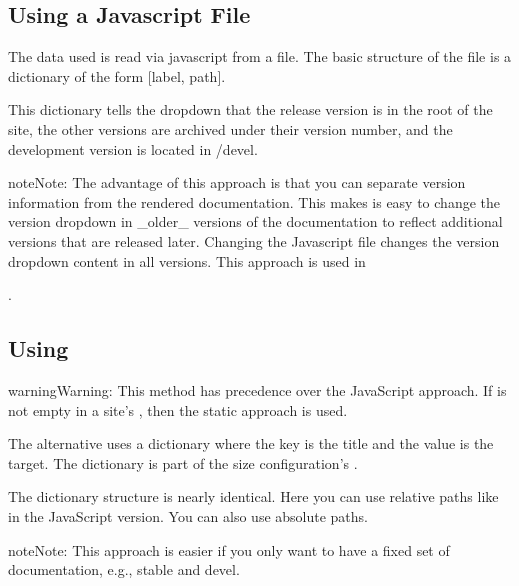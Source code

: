 \documentclass[letterpaper,10pt,english]{sphinxmanual}
\begin{document}
\subsection{Using a Javascript File}
\label{\detokenize{customization:using-a-javascript-file}}
The data used is read via javascript from a file. The basic structure of the file is a dictionary of the form {[}label, path{]}.

This dictionary tells the dropdown that the release version is in the root of the site, the
other versions are archived under their version number, and the development version is
located in /devel.

\begin{sphinxadmonition}{note}{Note:}
The advantage of this approach is that you can separate version information
from the rendered documentation.  This makes is easy to change the version
dropdown in \_older\_ versions of the documentation to reflect additional versions
that are released later. Changing the Javascript file changes the version dropdown
content in all versions.  This approach is used in
%
\begin{footnote}[4]\sphinxAtStartFootnote
{}
%
\end{footnote}.
\end{sphinxadmonition}


\subsection{Using }
\label{\detokenize{customization:using-conf-py}}
\begin{sphinxadmonition}{warning}{Warning:}
This method has precedence over the JavaScript approach. If  is
not empty in a site’s , then the static approach is used.
\end{sphinxadmonition}

The alternative uses a dictionary where the key is the title and the value is the target.
The dictionary is part of the size configuration’s .

The dictionary structure is nearly identical.  Here you can use relative paths
like in the JavaScript version. You can also use absolute paths.

\begin{sphinxadmonition}{note}{Note:}
This approach is easier if you only want to have a fixed set of documentation,
e.g., stable and devel.
\end{sphinxadmonition}
\end{document}
